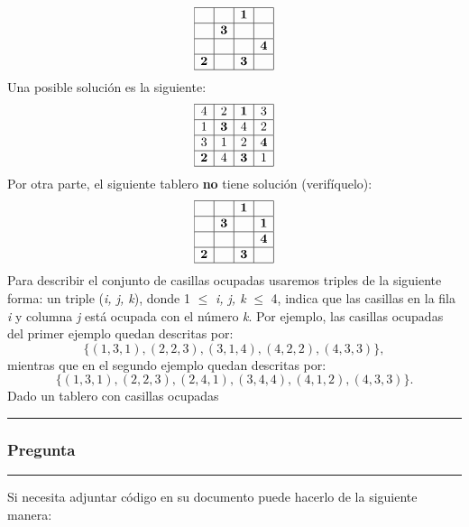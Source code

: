 \documentclass[12pt]{article}
\begin{document}
\[
\begin{array}{|c|c|c|c|} \hline
 &  & \textbf{1} &  \\ \hline
 & \textbf{3} &  &  \\ \hline
 &  &  & \textbf{4} \\ \hline
\textbf{2} &  & \textbf{3} &  \\ \hline
\end{array}
\]
Una posible solución es la siguiente:
\[
\begin{array}{|c|c|c|c|} \hline
4 & 2 & \textbf{1} & 3 \\ \hline
1 & \textbf{3} & 4 & 2 \\ \hline
3 & 1 & 2 & \textbf{4} \\ \hline
\textbf{2} & 4 & \textbf{3} & 1 \\ \hline
\end{array}
\]
Por otra parte, el siguiente tablero \textbf{no} tiene solución (verifíquelo):
\[
\begin{array}{|c|c|c|c|} \hline
 &  & \textbf{1} &  \\ \hline
 & \textbf{3} &  & \textbf{1} \\ \hline
 &  &  & \textbf{4} \\ \hline
\textbf{2} &  & \textbf{3} &  \\ \hline
\end{array}
\]
Para describir el conjunto de casillas ocupadas usaremos triples de la siguiente forma: un triple
(\textit{i, j, k}), donde 1 $\leq$ \textit{i, j, k} $\leq$ 4, indica que las casillas en la fila \textit{i}
y columna \textit{j} está ocupada con el número \textit{k}. Por ejemplo, las casillas ocupadas del primer
ejemplo quedan descritas por:
\[\{(1, 3, 1), (2, 2, 3), (3, 1, 4), (4, 2, 2), (4, 3, 3)\},\]
mientras que en el segundo ejemplo quedan descritas por:
\[\{(1, 3, 1), (2, 2, 3), (2, 4, 1), (3, 4, 4), (4, 1, 2), (4, 3, 3)\}.\]
Dado un tablero con casillas ocupadas

\rule{\linewidth}{0.4pt} %


\subsubsection*{Pregunta }
\rule{\linewidth}{0.4pt} %



Si necesita adjuntar código en su documento puede hacerlo de la siguiente manera:
\end{document}
